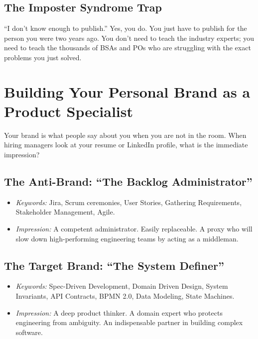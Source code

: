 \documentclass[
  11pt,
  openany,
  oneside]{book}
\providecommand{\tightlist}{%
  \setlength{\itemsep}{0pt}\setlength{\parskip}{0pt}}
\begin{document}
\subsection{The Imposter Syndrome
Trap}\label{the-imposter-syndrome-trap}

``I don't know enough to publish.'' Yes, you do. You just have to
publish for the person you were two years ago. You don't need to teach
the industry experts; you need to teach the thousands of BSAs and POs
who are struggling with the exact problems you just solved.

\bigskip

\section{Building Your Personal Brand as a Product
Specialist}\label{building-your-personal-brand-as-a-product-specialist}

Your brand is what people say about you when you are not in the room.
When hiring managers look at your resume or LinkedIn profile, what is
the immediate impression?

\subsection{The Anti-Brand: ``The Backlog
Administrator''}\label{the-anti-brand-the-backlog-administrator}

\begin{itemize}
\tightlist
\item
  \emph{Keywords:} Jira, Scrum ceremonies, User Stories, Gathering
  Requirements, Stakeholder Management, Agile.
\item
  \emph{Impression:} A competent administrator. Easily replaceable. A
  proxy who will slow down high-performing engineering teams by acting
  as a middleman.
\end{itemize}

\subsection{The Target Brand: ``The System
Definer''}\label{the-target-brand-the-system-definer}

\begin{itemize}
\tightlist
\item
  \emph{Keywords:} Spec-Driven Development, Domain Driven Design, System
  Invariants, API Contracts, BPMN 2.0, Data Modeling, State Machines.
\item
  \emph{Impression:} A deep product thinker. A domain expert who
  protects engineering from ambiguity. An indispensable partner in
  building complex software.
\end{itemize}
\end{document}
